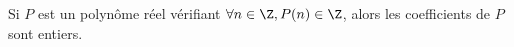 Si $P$ est un polynôme réel vérifiant $\forall n \in \Z, P(n) \in \Z$, alors les coefficients de $P$ sont entiers.

\begin{reponses}
\end{reponses}

